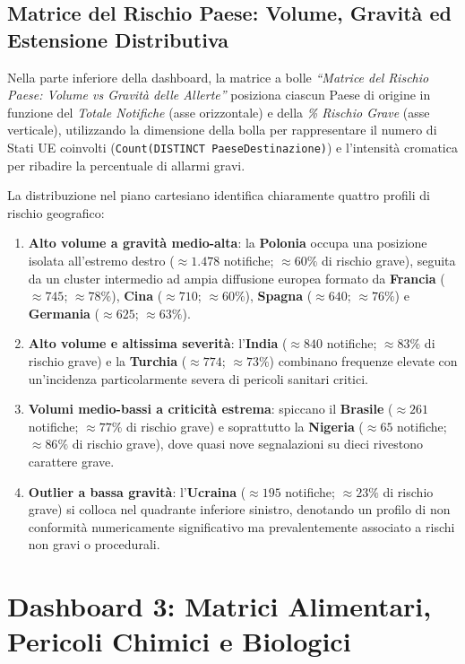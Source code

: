 \subsection{Matrice del Rischio Paese: Volume, Gravità ed Estensione Distributiva}
Nella parte inferiore della dashboard, la matrice a bolle \textit{``Matrice del Rischio Paese: Volume vs Gravità delle Allerte''} posiziona ciascun Paese di origine in funzione del \textit{Totale Notifiche} (asse orizzontale) e della \textit{\% Rischio Grave} (asse verticale), utilizzando la dimensione della bolla per rappresentare il numero di Stati UE coinvolti (\texttt{Count(DISTINCT PaeseDestinazione)}) e l'intensità cromatica per ribadire la percentuale di allarmi gravi.

La distribuzione nel piano cartesiano identifica chiaramente quattro profili di rischio geografico:
\begin{enumerate}
    \item \textbf{Alto volume a gravità medio-alta}: la \textbf{Polonia} occupa una posizione isolata all'estremo destro ($\approx 1.478$ notifiche; $\approx 60\%$ di rischio grave), seguita da un cluster intermedio ad ampia diffusione europea formato da \textbf{Francia} ($\approx 745$; $\approx 78\%$), \textbf{Cina} ($\approx 710$; $\approx 60\%$), \textbf{Spagna} ($\approx 640$; $\approx 76\%$) e \textbf{Germania} ($\approx 625$; $\approx 63\%$).
    \item \textbf{Alto volume e altissima severità}: l'\textbf{India} ($\approx 840$ notifiche; $\approx 83\%$ di rischio grave) e la \textbf{Turchia} ($\approx 774$; $\approx 73\%$) combinano frequenze elevate con un'incidenza particolarmente severa di pericoli sanitari critici.
    \item \textbf{Volumi medio-bassi a criticità estrema}: spiccano il \textbf{Brasile} ($\approx 261$ notifiche; $\approx 77\%$ di rischio grave) e soprattutto la \textbf{Nigeria} ($\approx 65$ notifiche; $\approx 86\%$ di rischio grave), dove quasi nove segnalazioni su dieci rivestono carattere grave.
    \item \textbf{Outlier a bassa gravità}: l'\textbf{Ucraina} ($\approx 195$ notifiche; $\approx 23\%$ di rischio grave) si colloca nel quadrante inferiore sinistro, denotando un profilo di non conformità numericamente significativo ma prevalentemente associato a rischi non gravi o procedurali.
\end{enumerate}

\section{Dashboard 3: Matrici Alimentari, Pericoli Chimici e Biologici}
\label{sec:qlik_dash3}

